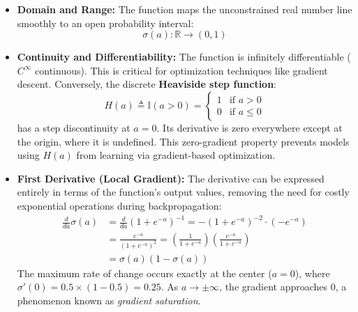 \documentclass{article}
\begin{document}
\begin{itemize}
    \item \textbf{Domain and Range:} The function maps the unconstrained real number line smoothly to an open probability interval:
    \begin{equation}
        \sigma(a): \mathbb{R} \to (0, 1)
    \end{equation}
    
    \item \textbf{Continuity and Differentiability:} The function is infinitely differentiable ($C^\infty$ continuous). This is critical for optimization techniques like gradient descent. Conversely, the discrete \textbf{Heaviside step function}:
    \begin{equation}
        H(a) \triangleq \mathbb{I}(a > 0) = \begin{cases} 1 & \text{if } a > 0 \\ 0 & \text{if } a \le 0 \end{cases}
    \end{equation}
    has a step discontinuity at $a=0$. Its derivative is zero everywhere except at the origin, where it is undefined. This zero-gradient property prevents models using $H(a)$ from learning via gradient-based optimization.
    
    \item \textbf{First Derivative (Local Gradient):} The derivative can be expressed entirely in terms of the function's output values, removing the need for costly exponential operations during backpropagation:
    \begin{align}
        \frac{d}{da}\sigma(a) &= \frac{d}{da} (1 + e^{-a})^{-1} = -(1 + e^{-a})^{-2} \cdot (-e^{-a}) \\
        &= \frac{e^{-a}}{(1 + e^{-a})^2} = \left(\frac{1}{1 + e^{-a}}\right)\left(\frac{e^{-a}}{1 + e^{-a}}\right) \\
        &= \sigma(a)\left(1 - \sigma(a)\right)
    \end{align}
    The maximum rate of change occurs exactly at the center ($a=0$), where $\sigma'(0) = 0.5 \times (1 - 0.5) = 0.25$. As $a \to \pm\infty$, the gradient approaches $0$, a phenomenon known as \textit{gradient saturation}.


\end{itemize}
\end{document}
